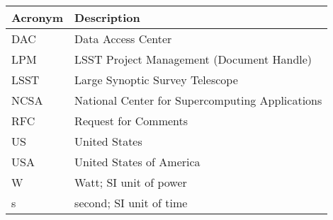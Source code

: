 \addtocounter{table}{-1}
\begin{longtable}{|l|p{}|}\hline
\textbf{Acronym} & \textbf{Description}  \\\hline

DAC&Data Access Center \\\hline
LPM&LSST Project Management (Document Handle) \\\hline
LSST&Large Synoptic Survey Telescope \\\hline
NCSA&National Center for Supercomputing Applications \\\hline
RFC&Request for Comments \\\hline
US&United States \\\hline
USA&United States of America \\\hline
W&Watt; SI unit of power \\\hline
s&second; SI unit of time \\\hline
\end{longtable}
